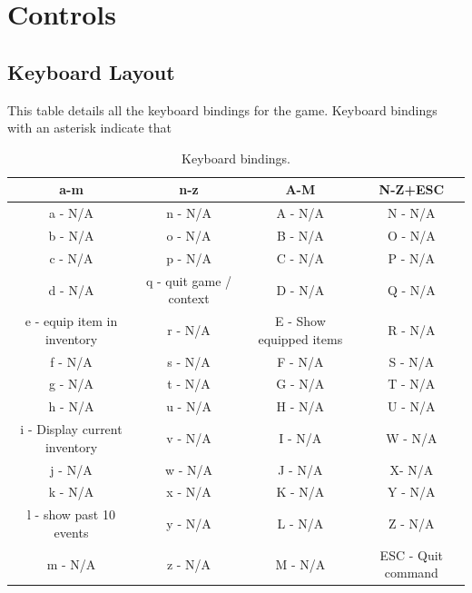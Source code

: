 \documentclass{report}
\begin{document}
\section*{Controls}
\subsection*{Keyboard Layout}
This table details all the keyboard bindings for the game. Keyboard bindings with an asterisk indicate that
\begin{table}[h!]
\centering
\begin{tabular}{|c| c| c |c|} 
\hline
 a-m & n-z & A-M & N-Z+ESC \\ [0.5ex] 
 \hline
 a - N/A & n - N/A & A - N/A & N - N/A \\ 
 b - N/A & o - N/A & B - N/A & O - N/A \\
 c - N/A & p - N/A & C - N/A & P - N/A  \\
 d - N/A & q - quit game / context & D - N/A & Q - N/A  \\
 e - equip item in inventory & r - N/A & E - Show equipped items & R - N/A \\ 
 f - N/A & s - N/A & F - N/A & S - N/A \\
 g - N/A & t - N/A & G - N/A & T - N/A \\
 h - N/A & u - N/A & H - N/A & U - N/A \\
 i - Display current inventory & v - N/A & I - N/A & W - N/A \\
 j - N/A & w - N/A & J - N/A & X- N/A \\
 k - N/A & x - N/A & K - N/A & Y - N/A \\
 l - show past 10 events & y - N/A & L - N/A & Z - N/A \\
 m - N/A & z - N/A & M - N/A & ESC - Quit command \\ [1ex] 
 \hline
\end{tabular}
\caption{Keyboard bindings.}
\label{table:1}
\end{table}
\end{document}
